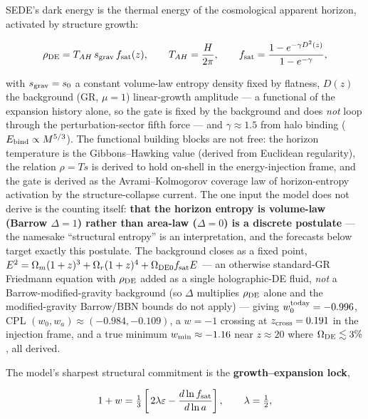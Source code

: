 \documentclass[submission, Phys]{SciPost}
\begin{document}
SEDE's dark energy is the thermal energy of the cosmological apparent
horizon, activated by structure growth:

\begin{equation}
\rho_{\rm DE} = T_{AH}\, s_{\rm grav}\, f_{\rm sat}(z),
\qquad
T_{AH} = \frac{H}{2\pi},
\qquad
f_{\rm sat} = \frac{1 - e^{-\gamma D^2(z)}}{1 - e^{-\gamma}},
\end{equation}

with \(s_{\rm grav} = s_0\) a constant volume-law entropy density fixed
by flatness, \(D(z)\) the background (GR, \(\mu=1\)) linear-growth
amplitude --- a functional of the expansion history alone, so the gate
is fixed by the background and does \emph{not} loop through the
perturbation-sector fifth force --- and \(\gamma \approx 1.5\) from halo
binding (\(E_{\rm bind}\propto M^{5/3}\)). The functional building
blocks are not free: the horizon temperature is the Gibbons--Hawking
value (derived from Euclidean regularity), the relation \(\rho = Ts\) is
derived to hold on-shell in the energy-injection frame, and the gate is
derived as the Avrami--Kolmogorov coverage law of horizon-entropy
activation by the structure-collapse current. The one input the model
does not derive is the counting itself: \textbf{that the horizon entropy
is volume-law (Barrow \(\Delta = 1\)) rather than area-law
(\(\Delta = 0\)) is a discrete postulate} --- the namesake ``structural
entropy'' is an interpretation, and the forecasts below target exactly
this postulate. The background closes as a fixed point,
\(E^2 = \Omega_m(1+z)^3 + \Omega_r(1+z)^4 + \Omega_{\rm DE0} f_{\rm sat}E\)
--- an otherwise standard-GR Friedmann equation with \(\rho_{\rm DE}\)
added as a single holographic-DE fluid, \emph{not} a
Barrow-modified-gravity background (so \(\Delta\) multiplies
\(\rho_{\rm DE}\) alone and the modified-gravity Barrow/BBN bounds do
not apply) --- giving \(w_0^{\rm today} = -0.996\), CPL
\((w_0, w_a) \approx (-0.984, -0.109)\), a \(w=-1\) crossing at
\(z_{\rm cross} = 0.191\) in the injection frame, and a true minimum
\(w_{\rm min}\approx -1.16\) near \(z\approx 20\) where
\(\Omega_{\rm DE}\lesssim 3\%\), all derived.

The model's sharpest structural commitment is the
\textbf{growth--expansion lock},

\begin{equation}
1 + w = \tfrac{1}{3}\left[\,2\lambda\varepsilon - \frac{d\ln f_{\rm sat}}{d\ln a}\right],
\qquad \lambda = \tfrac12,
\end{equation}
\end{document}
